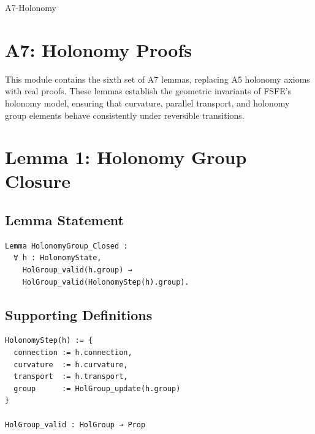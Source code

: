 \documentclass[11pt]{article}
\begin{document}


\begin{citationmembrane}{A7-Holonomy}
\end{citationmembrane}

\section*{A7: Holonomy Proofs}

This module contains the sixth set of A7 lemmas, replacing A5 holonomy axioms
with real proofs. These lemmas establish the geometric invariants of FSFE’s
holonomy model, ensuring that curvature, parallel transport, and holonomy group
elements behave consistently under reversible transitions.

\newpage


\section{Lemma 1: Holonomy Group Closure}

\subsection{Lemma Statement}

\begin{verbatim}
Lemma HolonomyGroup_Closed :
  ∀ h : HolonomyState,
    HolGroup_valid(h.group) →
    HolGroup_valid(HolonomyStep(h).group).
\end{verbatim}

\subsection{Supporting Definitions}

\begin{verbatim}
HolonomyStep(h) := {
  connection := h.connection,
  curvature  := h.curvature,
  transport  := h.transport,
  group      := HolGroup_update(h.group)
}

HolGroup_valid : HolGroup → Prop
\end{verbatim}
\end{document}
